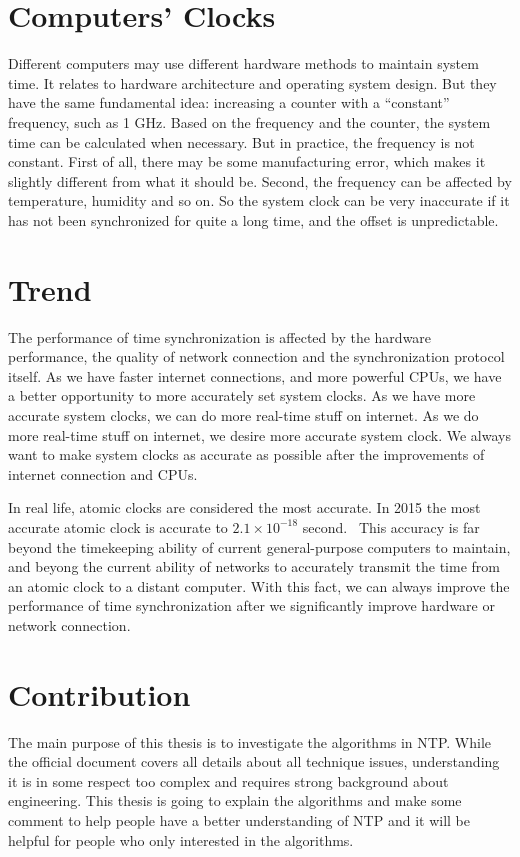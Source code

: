 \section{Computers' Clocks}
\label{sec:computers_clocks}
Different computers may use different hardware methods to maintain system time.
It relates to hardware architecture and operating system design. But they have
the same fundamental idea: increasing a counter with a ``constant'' frequency,
such as 1 GHz.
Based on the frequency and the counter, the system time can be calculated
when necessary. But in practice, the frequency is not constant. First of all,
there may be some manufacturing error, which makes it slightly different from
what it should be. Second, the frequency can be affected by temperature,
humidity and so on. So the system clock can be very inaccurate if it has not
been synchronized for quite a long time, and the offset is unpredictable.

\section{Trend}
\label{sec:trend}
The performance of time synchronization is affected by the hardware
performance, the quality of network connection and the synchronization protocol
itself. 
As we have faster internet connections, and more powerful CPUs, we have a
better opportunity to more accurately set system clocks. As we have more
accurate system clocks, we can do more real-time stuff on internet. As we do
more real-time stuff on internet, we desire more accurate system clock. We
always want to make system clocks as accurate as possible after the
improvements of internet connection and CPUs. 

In real life, atomic clocks are considered the most accurate. In 2015 the most
accurate atomic clock is accurate to $2.1\times 10^{-18}$
second.~\cite{atomic_clock} 
This accuracy is far beyond the timekeeping ability of current general-purpose
computers to maintain, and beyong the current ability of networks to accurately
transmit the time from an atomic clock to a distant computer. With this fact,
we can always improve the performance of time synchronization after we
significantly improve hardware or network connection.

\section{Contribution}
\label{sec:contribution}
The main purpose of this thesis is to investigate the algorithms in NTP. While 
the official document covers all details about all technique issues, understanding
it is in some respect too complex and requires strong background about engineering.
This thesis is going to explain the algorithms and make some comment to help 
people have a better understanding of NTP and it will be helpful for people who
only interested in the algorithms.
